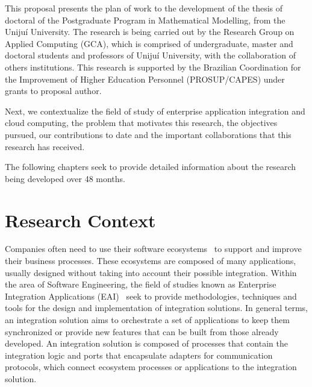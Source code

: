 This proposal presents the plan of work to the development of the thesis of doctoral of the Postgraduate Program in Mathematical Modelling, from the Unijuí University.
The research is being carried out by the Research Group on Applied Computing (GCA), which is comprised of undergraduate, master and doctoral students and professors of Unijuí University, with the collaboration of others institutions. This research is supported by the Brazilian Coordination for the Improvement of Higher Education Personnel (PROSUP/CAPES) under grants to proposal author.

Next, we contextualize the field of study of enterprise application integration and cloud computing, the problem that motivates this research, the objectives pursued, our contributions to date and the important collaborations that this research has received.

The following chapters seek to provide detailed information about the research being developed over 48 months.
\section{Research Context}

\noindent 
Companies often need to use their software ecosystems~\cite{messerschmitt:2005} to support and improve their business processes. These ecosystems are composed of many applications, usually designed without taking into account their possible integration. Within the area of Software Engineering, the field of studies known as Enterprise Integration Applications (EAI)~\cite{frantz2016} seek to provide methodologies, techniques and tools for the design and implementation of integration solutions. In general terms, an integration solution aims to orchestrate a set of applications to keep them synchronized or provide new features that can be built from those already developed. An integration solution is composed of processes that contain the integration logic and ports that encapsulate adapters for communication protocols, which connect ecosystem processes or applications to the integration solution.

